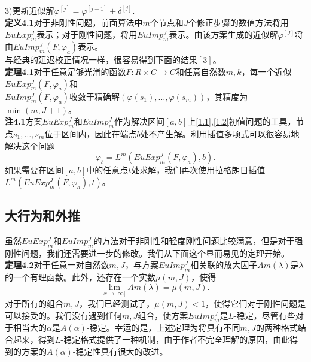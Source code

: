 \documentclass[12pt,a4paper]{article}
\begin{document}
$3)$更新近似解$\varphi^{[j]}=\varphi^{[j-1]}+\delta^{[j]}$.\\

\textbf{定义4.1}对于非刚性问题，前面算法中$m$个节点和$J$个修正步骤的数值方法将用$EuExp_{m}^{J}$表示；对于刚性问题，将用$EuImp_{m}^{J}$表示。由该方案生成的近似解$\varphi^{[J]}$将由$EuImp_{m}^{J}(F,\varphi_a)$表示。\\

与经典的延迟校正情况一样，很容易得到下面的结果$[3]$。\\

\textbf{定理4.1}对于任意足够光滑的函数$F:R \times C\rightarrow C$和任意自然数$m,k$，每一个近似$EuExp_{m}^{J}(F,\varphi_a)$和\\$EuImp_{m}^{J}(F,\varphi_a)$收敛于精确解$(\varphi(s_1),\ldots,\varphi(s_m))$，其精度为$\min(m,J+1)$。\\

\textbf{注4.1}方案$EuExp_{m}^{J}$和$EuImp_{m}^{J}$作为解决区间$[a,b]$上\ref{1.1},\ref{1.2}初值问题的工具，节点$s_1,\ldots,s_m$位于区间内，因此在端点$b$处不产生解。利用插值多项式可以很容易地解决这个问题\\
\begin{equation}
\varphi_b=L^m(EuExp_{m}^{J}(F,\varphi_a),b).
\end{equation}
如果需要在区间$[a,b]$中的任意点$t$处求解，我们再次使用拉格朗日插值$L^m(EuExp^{J}_{m}(F,\varphi_a),t)$。\\

\subsection{大行为和外推}

虽然$EuExp_{m}^{J}$和$EuImp_{m}^{J}$的方法对于非刚性和轻度刚性问题比较满意，但是对于强刚性问题，我们还需要进一步的修改。我们从下面这个显而易见的定理开始。\\

\textbf{定理4.2}对于任意一对自然数$m,J$，与方案$EuImp_{m}^{J}$相关联的放大因子$Am(\lambda)$是$\lambda$的一个有理函数。此外，还存在一个实数$\mu(m,J)$，使得\\
\begin{equation}
\lim_{x \to |\infty|} Am(\lambda)= \mu(m,J).
\end{equation}
对于所有的组合$m,J$，我们已经测试了，$\mu(m,J)<1$，使得它们对于刚性问题是可以接受的。我们没有遇到任何$m,J$组合，使方案$EuImp_{m}^{J}$是$L$-稳定，尽管有些对于相当大的$\alpha$是$A(\alpha)$-稳定。幸运的是，上述定理为将具有不同$m,J$的两种格式结合起来，得到$L$-稳定格式提供了一种机制，由于作者不完全理解的原因，由此得到的方案的$A(\alpha)$-稳定性具有很大的改进。\\
\end{document}
